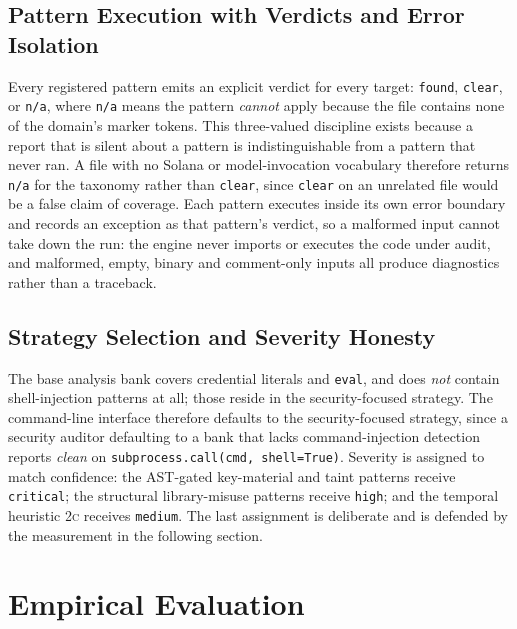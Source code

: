 \subsection{Pattern Execution with Verdicts and Error Isolation}

Every registered pattern emits an explicit verdict for every target:
\texttt{found}, \texttt{clear}, or \texttt{n/a}, where \texttt{n/a} means the
pattern \emph{cannot} apply because the file contains none of the domain's
marker tokens. This three-valued discipline exists because a report that is
silent about a pattern is indistinguishable from a pattern that never ran. A
file with no Solana or model-invocation vocabulary therefore returns
\texttt{n/a} for the taxonomy rather than \texttt{clear}, since \texttt{clear}
on an unrelated file would be a false claim of coverage. Each pattern executes
inside its own error boundary and records an exception as that pattern's
verdict, so a malformed input cannot take down the run: the engine never
imports or executes the code under audit, and malformed, empty, binary and
comment-only inputs all produce diagnostics rather than a traceback.

\subsection{Strategy Selection and Severity Honesty}

The base analysis bank covers credential literals and \texttt{eval}, and does
\emph{not} contain shell-injection patterns at all; those reside in the
security-focused strategy. The command-line interface therefore defaults to the
security-focused strategy, since a security auditor defaulting to a bank that
lacks command-injection detection reports \emph{clean} on
\texttt{subprocess.call(cmd, shell=True)}. Severity is assigned to match
confidence: the AST-gated key-material and taint patterns receive
\texttt{critical}; the structural library-misuse patterns receive
\texttt{high}; and the temporal heuristic \textsc{2c} receives \texttt{medium}.
The last assignment is deliberate and is defended by the measurement in the
following section.

\section{Empirical Evaluation}
\label{sec:eval}

